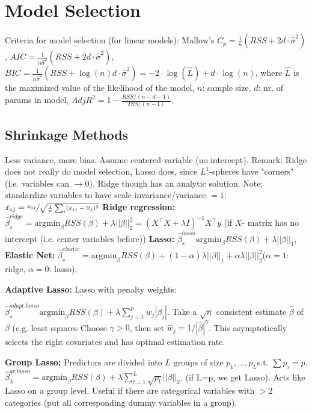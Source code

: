 \section*{Model Selection}
Criteria for model selection (for linear models): 
$\text{Mallow's }C_p=\tfrac 1 n (RSS + 2d\cdot \hat\sigma^2)$, 
$AIC = \tfrac{1}{n\hat\sigma^2}(RSS+2d\cdot\hat\sigma^2)$, 
$BIC= \tfrac{1}{n\hat\sigma^2}(RSS+\log(n)d\cdot\hat\sigma^2) = -2 \cdot\log(\hat L) + d\cdot\log(n)$, 
where $\hat L$ is the maximized value of the likelihood of the model, 
$n$: sample size, $d$: nr. of params in model, $AdjR^2=1-\tfrac{RSS / (n-d-1)}{TSS / (n-1)}$.

\subsection*{Shrinkage Methods}
Less variance, more bias.
Assume centered variable (no intercept).
Remark: Ridge does not really do model selection, Lasso does, since $L^1$-spheres have "corners" (i.e. variables can $\rightarrow 0$). 
Ridge though has an analytic solution. 
Note: standardize variables to have scale invariance/variance $= 1$: $\tilde x_{ij}=\sfrac{x_{ij}}{\sqrt{\tfrac{1}{n} \sum_i(x_{ij}- \overline x_j)^2}}$
\textbf{Ridge regression:} $\hat\beta_s^{ridge} = \text{argmin}_\beta RSS(\beta) + \lambda ||\beta||_2^2 = (X^\top X + \lambda I)^{-1}X^\top y$ (if $X$- matrix has no intercept (i.e. center variables before))
\textbf{Lasso:} 
$\hat\beta_s^{lasso}\text{argmin}_\beta RSS(\beta) + \lambda ||\beta||_1$,
\textbf{Elastic Net:} $\hat\beta_s^{elastic} = \text{argmin}_\beta RSS(\beta)+(1-\alpha)\lambda||\beta||_1 + \alpha \lambda ||\beta||_2^2$($\alpha=1$: ridge, $\alpha=0$: lasso),

\textbf{Adaptive Lasso:} Lasso with penalty weights:

$\hat\beta_s^{adapt.lasso}\text{argmin}_\beta RSS(\beta) + \lambda \sum_{j=1}^p w_j |\beta_j|$. Take a $\sqrt{n}$ consistent estimate $\hat\beta$ of $\beta$ (e.g. least squares Choose $\gamma>0$, then set $\hat w_j = {1}/{|\hat\beta|^\gamma}$.
This asymptotically selects the right covariates and has optimal estimation rate.

\textbf{Group Lasso:} Predictors are divided into $L$ groups of size $p_1, ..., p_L$s.t. $\sum p_i = p$. $\hat\beta_\lambda^{gr.lasso}=\text{argmin}_\beta RSS(\beta)+\lambda \sum_{l=1}^L \sqrt{p_l} ||\beta||_2$. (if L=p, we get Lasso).
Acts like Lasso on a group level.
Useful if there are categorical variables with $>2$ categories (put all corresponding dummy variables in a group).


